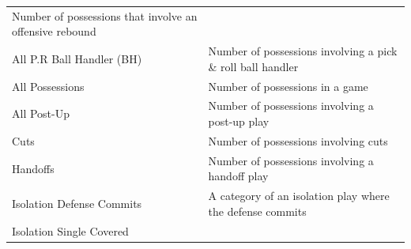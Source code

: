 \documentclass[]{book}
\begin{document}
\begin{longtable}[]{@{}ll@{}}
\begin{minipage}[t]{0.65\columnwidth}
Number of possessions that involve an offensive rebound\strut
\end{minipage}\tabularnewline
\begin{minipage}[t]{0.29\columnwidth}\raggedright
All P.R Ball Handler (BH)\strut
\end{minipage} & \begin{minipage}[t]{0.65\columnwidth}\raggedright
Number of possessions involving a pick \& roll ball handler\strut
\end{minipage}\tabularnewline
\begin{minipage}[t]{0.29\columnwidth}\raggedright
All Possessions\strut
\end{minipage} & \begin{minipage}[t]{0.65\columnwidth}\raggedright
Number of possessions in a game\strut
\end{minipage}\tabularnewline
\begin{minipage}[t]{0.29\columnwidth}\raggedright
All Post-Up\strut
\end{minipage} & \begin{minipage}[t]{0.65\columnwidth}\raggedright
Number of possessions involving a post-up play\strut
\end{minipage}\tabularnewline
\begin{minipage}[t]{0.29\columnwidth}\raggedright
Cuts\strut
\end{minipage} & \begin{minipage}[t]{0.65\columnwidth}\raggedright
Number of possessions involving cuts\strut
\end{minipage}\tabularnewline
\begin{minipage}[t]{0.29\columnwidth}\raggedright
Handoffs\strut
\end{minipage} & \begin{minipage}[t]{0.65\columnwidth}\raggedright
Number of possessions involving a handoff play\strut
\end{minipage}\tabularnewline
\begin{minipage}[t]{0.29\columnwidth}\raggedright
Isolation Defense Commits\strut
\end{minipage} & \begin{minipage}[t]{0.65\columnwidth}\raggedright
A category of an isolation play where the defense commits\strut
\end{minipage}\tabularnewline
\begin{minipage}[t]{0.29\columnwidth}\raggedright
Isolation Single Covered\strut
\end{minipage} & \begin{minipage}[t]{0.65\columnwidth}\raggedright

\end{minipage}
\end{longtable}
\end{document}
